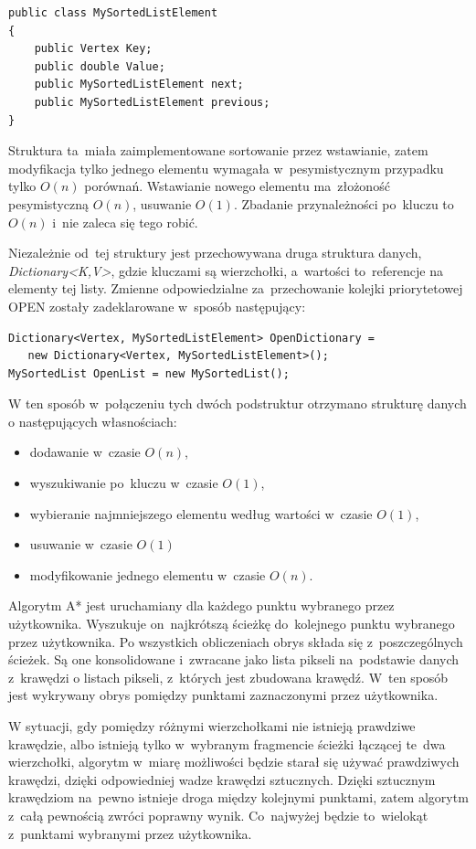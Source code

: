 \documentclass[a4paper,11pt,twoside,openright]{report}
\theoremstyle{definition}
\begin{document}
\begin{verbatim}
public class MySortedListElement
{
    public Vertex Key;
    public double Value;
    public MySortedListElement next;
    public MySortedListElement previous;
}
\end{verbatim}

Struktura ta~miała zaimplementowane sortowanie przez wstawianie, zatem modyfikacja
tylko jednego elementu wymagała w~pesymistycznym przypadku tylko $O(n)$ porównań.
Wstawianie nowego elementu ma~złożoność pesymistyczną $O(n)$, usuwanie $O(1)$.
Zbadanie przynależności po~kluczu to~$O(n)$ i~nie zaleca się tego robić.

Niezależnie od~tej struktury jest przechowywana druga struktura danych,
\textit{Dictionary<K,V>}, gdzie kluczami są wierzchołki, a~wartości to~referencje na
elementy tej listy. Zmienne odpowiedzialne za~przechowanie kolejki priorytetowej
OPEN zostały zadeklarowane w~sposób następujący:

\begin{verbatim}
Dictionary<Vertex, MySortedListElement> OpenDictionary =
   new Dictionary<Vertex, MySortedListElement>();
MySortedList OpenList = new MySortedList();
\end{verbatim}

W ten sposób w~połączeniu tych dwóch podstruktur otrzymano strukturę danych
o następujących własnościach:
\begin{itemize}[noitemsep]
\item dodawanie w~czasie $O(n)$,
\item wyszukiwanie po~kluczu w~czasie $O(1)$,
\item wybieranie najmniejszego elementu według wartości w~czasie $O(1)$,
\item usuwanie w~czasie $O(1)$
\item modyfikowanie jednego elementu w~czasie $O(n)$.
\end{itemize}

Algorytm A* jest uruchamiany dla każdego punktu wybranego przez użytkownika.
Wyszukuje on~najkrótszą ścieżkę do~kolejnego punktu wybranego przez użytkownika.
Po wszystkich obliczeniach obrys składa się z~poszczególnych ścieżek. Są one
konsolidowane i~zwracane jako lista pikseli na~podstawie danych z~krawędzi o
listach pikseli, z~których jest zbudowana krawędź. W~ten sposób jest wykrywany
obrys pomiędzy punktami zaznaczonymi przez użytkownika.

W sytuacji, gdy pomiędzy różnymi wierzchołkami nie istnieją prawdziwe krawędzie,
albo istnieją tylko w~wybranym fragmencie ścieżki łączącej te~dwa wierzchołki,
algorytm w~miarę możliwości będzie starał się używać prawdziwych krawędzi, dzięki
odpowiedniej wadze krawędzi sztucznych. Dzięki sztucznym krawędziom na~pewno
istnieje droga między kolejnymi punktami, zatem algorytm z~całą pewnością zwróci
poprawny wynik. Co~najwyżej będzie to~wielokąt z~punktami wybranymi przez użytkownika.
\end{document}
